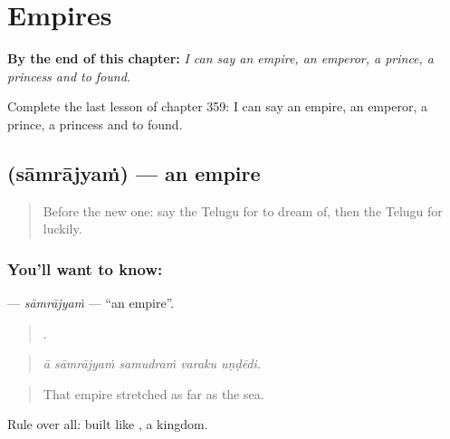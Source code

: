 
\chapter{Empires}
\label{ch:te-empires}

\begin{chapteropening}
\textbf{By the end of this chapter:} \emph{I can say an empire, an emperor, a prince, a princess and to found.}

Complete the last lesson of chapter 359: I can say an empire, an emperor, a prince, a princess and to found.
\end{chapteropening}

\section[\texorpdfstring{\te{సామ్రాజ్యం} (sāmrājyaṁ)}{సామ్రాజ్యం (sāmrājyaṁ)}]{ (sāmrājyaṁ) — an empire}

\label{lesson:TE-C359-samrajyam}



\begin{quote}
Before the new one: say the Telugu for to dream of, then the Telugu for luckily.
\end{quote}

\subsection*{You'll want to know: }
\textbf{} — \emph{sāmrājyaṁ} — \textquotedblleft{}an empire\textquotedblright{}.

\begin{quote}
    .
\end{quote}

\begin{quote}
\emph{ā sāmrājyaṁ samudraṁ varaku uṇḍēdi.}
\end{quote}

\begin{quote}
That empire stretched as far as the sea.
\end{quote}

Rule over all: built like , a kingdom.

